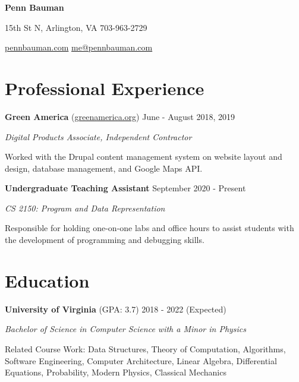 \documentclass[11pt]{article}
\author{Penn Bauman}
\begin{document}
\normalfont
\begin{center}
	{\huge \textbf{Penn Bauman}}
\end{center}

\vspace*{1mm}

 15th St N, Arlington, VA
\hspace*{\fill}
703-963-2729

\vspace*{1mm}

\noindent \href{https://pennbauman.com}{pennbauman.com}
\hspace*{\fill}
\href{mailto:me@pennbauman.com}{me@pennbauman.com}




\section*{Professional Experience}

\noindent \textbf{Green America} (\href{https://greenamerica.org}{greenamerica.org})
\hspace*{\fill} June - August 2018, 2019

\textit{Digital Products Associate, Independent Contractor}

\noindent Worked with the Drupal content management system on website layout and design, database management, and Google Maps API.


\vspace*{4mm}


\noindent \textbf{Undergraduate Teaching Assistant}
\hspace*{\fill} September 2020 - Present

\textit{CS 2150: Program and Data Representation}

\noindent Responsible for holding one-on-one labs and office hours to assist students with the development of programming and debugging skills.




\section*{Education}

\noindent \textbf{University of Virginia} (GPA: 3.7)
\hspace*{\fill} 2018 - 2022 (Expected)

\textit{Bachelor of Science in Computer Science with a Minor in Physics}

\noindent Related Course Work:
Data Structures, Theory of Computation, Algorithms,
Software Engineering, Computer Architecture,
Linear Algebra, Differential Equations, Probability,
Modern Physics, Classical Mechanics
\end{document}
